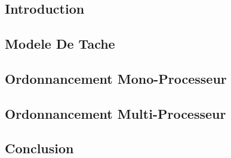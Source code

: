 \chapter{}
\section{Introduction}
\section{Modele De Tache}
\cite{ref}
\section{Ordonnancement Mono-Processeur}
\section{Ordonnancement Multi-Processeur}
\section{Conclusion}
